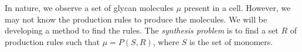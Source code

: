 In nature, we observe a set of glycan molecules $\mu$ present in a cell.
%
However, we may not know the production rules to produce the molecules.
%
We will be developing a method to find the rules.
%
The {\em synthesis problem} is to find a set $R$ of production rules
such that $\mu = P(S,R)$,
where $S$ is the set of monomers.




